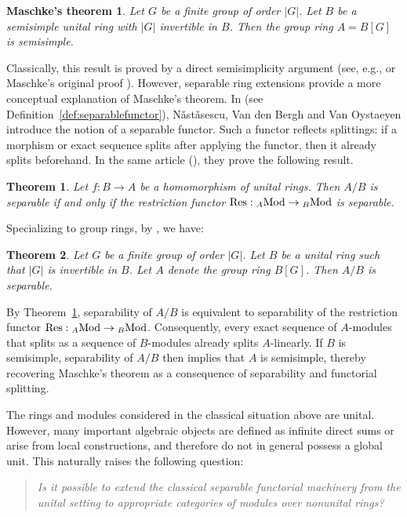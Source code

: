 \documentclass[12pt]{amsart}
\newtheorem{thm}{Theorem}
\newtheorem*{maschkestheorem*}{Maschke's theorem}
\theoremstyle{definition}
\newcommand{\Mod}{{\rm Mod}}
\newcommand{\Res}{{\rm Res}}
\begin{document}
\begin{maschkestheorem*}
Let $G$ be a finite group of 
order $|G|$. Let $B$ be a semisimple 
unital ring with $|G|$ invertible in $B$.
Then the group ring 
$A = B[G]$ is semisimple.
\end{maschkestheorem*}

Classically, this result is proved by a direct 
semisimplicity argument
(see, e.g., \cite[Thm.~(6.1)]{lam2001} or
Maschke's original proof \cite{maschke1899}). 
However, separable ring extensions provide a more conceptual explanation of Maschke’s theorem. 
In \cite{nastasescu1989} (see Definition~\ref{def:separablefunctor}), 
N{\v a}st{\v a}sescu, Van den Bergh and Van Oystaeyen introduce 
the notion of a separable functor. 
Such a functor reflects splittings: 
if a morphism or exact sequence splits after applying the functor, 
then it already splits beforehand. 
In the same article 
(\cite[Prop.~1.3]{nastasescu1989}), 
they prove the following result.

\begin{thm}\label{thm:main1}
Let $f : B \to A$ be a
homomorphism of unital rings.
Then $A/B$ is separable if and only if
the restriction functor
$\Res : {}_A \Mod \to 
{}_B \Mod$ is separable.
\end{thm}

Specializing to group rings, by
\cite[p.~41]{demeyer1971}, we have:

\begin{thm}\label{thm:main2}
Let $G$ be a finite group 
of order $|G|$.
Let $B$ be a unital ring such that 
$|G|$ is invertible in $B$. 
Let $A$ denote the group ring $B[G]$. 
Then $A/B$ is separable.
\end{thm}

By Theorem~\ref{thm:main1}, separability of 
$A/B$ is equivalent to separability 
of the restriction functor
$\Res : {}_A \Mod \to {}_B \Mod$.
Consequently, every exact sequence of $A$-modules 
that splits as a sequence of $B$-modules 
already splits $A$-linearly.
If $B$ is semisimple,
separability of $A/B$ then implies that $A$ is semisimple,
thereby recovering Maschke’s theorem as a consequence of 
separability and functorial splitting.

The rings and modules considered in the classical situation 
above are unital. However, many important algebraic objects 
are defined as infinite direct sums or arise from local constructions, 
and therefore do not in general possess a global unit.
This naturally raises  
the following question: 
\begin{quote}
\emph{Is it possible to extend the classical separable functorial machinery from the unital setting to appropriate categories of modules over nonunital rings?}
\end{quote}
\end{document}
